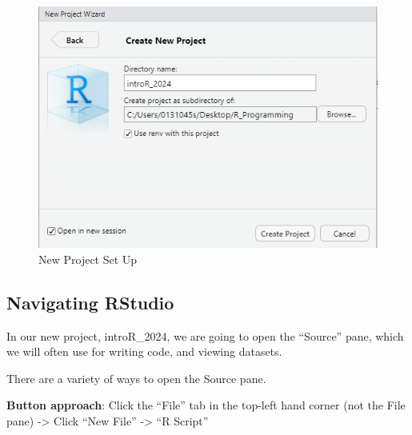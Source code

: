\documentclass[
]{book}
\begin{document}
\begin{figure}
\centering
\includegraphics{img/01-newproject.png}
\caption{\label{fig:unnamed-chunk-2}New Project Set Up}
\end{figure}

\hypertarget{navigating-rstudio}{%
\subsection{Navigating RStudio}\label{navigating-rstudio}}

In our new project, introR\_2024, we are going to open the ``Source'' pane, which we will often use for writing code, and viewing datasets.

There are a variety of ways to open the Source pane.

\textbf{Button approach}: Click the ``File'' tab in the top-left hand corner (not the File pane) -\textgreater{} Click ``New File'' -\textgreater{} ``R Script''
\end{document}
